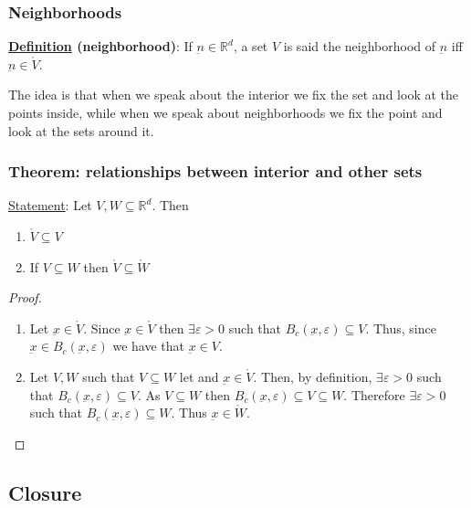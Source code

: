 \documentclass[10pt]{extarticle}
\newcommand{\R}{\mathbb{R}}
\newcommand{\munderbar}[1]{\underbar{\ensuremath{#1}}}
\newcommand{\skiplineafterproof}{$ $\par\nobreak\ignorespaces}
\begin{document}
\subsubsection{Neighborhoods}

\textbf{\underline{Definition} (neighborhood)}:
If $\munderbar{n} \in \R^d$, a set $V$ is said the neighborhood of $\munderbar{n}$ iff $\munderbar{n} \in \mathring{V}$.

The idea is that when we speak about the interior we fix the set and look at the points inside, while when we speak about neighborhoods we fix the point and look at the sets around it.

\subsubsection{Theorem: relationships between interior and other sets}

\underline{Statement}: Let $V, W \subseteq \R^d$.
Then

\begin{enumerate}
    \item $\mathring{V} \subseteq V$
    \item If $V \subseteq W$ then $\mathring{V} \subseteq \mathring{W}$
\end{enumerate}

\begin{proof}
    \skiplineafterproof
    \begin{enumerate}
        \item Let $\munderbar{x} \in \mathring{V}$.
              Since $\munderbar{x} \in \mathring{V}$ then $\exists \varepsilon > 0$ such that $B_c(\munderbar{x}, \varepsilon) \subseteq V$.
              Thus, since $\munderbar{x} \in B_c(\munderbar{x}, \varepsilon)$ we have that $\munderbar{x} \in V$.
        \item Let $V, W$ such that $V \subseteq W$ let and $\munderbar{x} \in \mathring{V}$.
              Then, by definition, $\exists \varepsilon > 0$ such that $B_c(\munderbar{x}, \varepsilon) \subseteq V$.
              As $V \subseteq W$ then $B_c(\munderbar{x}, \varepsilon) \subseteq V \subseteq W$.
              Therefore $\exists \varepsilon > 0$ such that $B_c(\munderbar{x}, \varepsilon) \subseteq W$.
              Thus $\munderbar{x} \in \mathring{W}$.
    \end{enumerate}
\end{proof}

\subsection{Closure}
\end{document}
